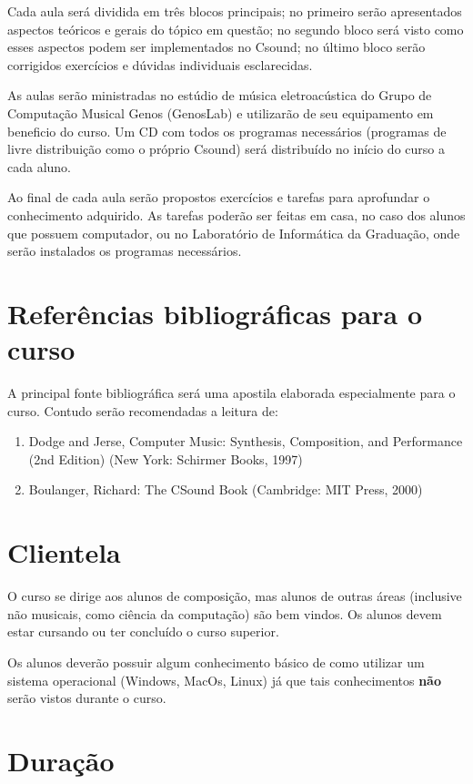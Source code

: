 \documentclass[12pt,brazil]{article}
\begin{document}
Cada aula será dividida em três blocos principais; no primeiro serão
apresentados aspectos teóricos e gerais do tópico em questão; no
segundo bloco será visto como esses aspectos podem ser implementados
no Csound; no último bloco serão corrigidos exercícios e dúvidas
individuais esclarecidas.

As aulas serão ministradas no estúdio de música eletroacústica do
Grupo de Computação Musical Genos (GenosLab) e utilizarão de seu
equipamento em beneficio do curso. Um CD com todos os programas
necessários (programas de livre distribuição como o próprio Csound)
será distribuído no início do curso a cada aluno.

Ao final de cada aula serão propostos exercícios e tarefas para
aprofundar o conhecimento adquirido. As tarefas poderão ser feitas em
casa, no caso dos alunos que possuem computador, ou no Laboratório de
Informática da Graduação, onde serão instalados os programas
necessários.

\section{Referências bibliográficas para o curso}
A principal fonte bibliográfica será uma apostila elaborada
especialmente para o curso. Contudo serão recomendadas a leitura de:

\begin{enumerate}
\item Dodge and Jerse, Computer Music: Synthesis, Composition, and
  Performance (2nd Edition) (New York: Schirmer Books, 1997)
\item Boulanger, Richard: The CSound Book (Cambridge: MIT Press, 2000)
 \end{enumerate}

\section{Clientela}
O curso se dirige aos alunos de composição, mas alunos de outras áreas
(inclusive não musicais, como ciência da computação) são bem vindos.
Os alunos devem estar cursando ou ter concluído o curso superior.
  
Os alunos deverão possuir algum conhecimento básico de como utilizar
um sistema operacional (Windows, MacOs, Linux) já que tais
conhecimentos \textbf{não} serão vistos durante o curso.

\section{Duração}
\end{document}
